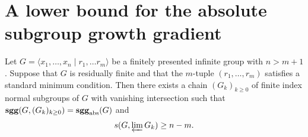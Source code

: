 \section{A lower bound for the absolute subgroup growth gradient}\label{section: lower bound subgroup growth gradient}

\begin{thm}\label{thm: subgroup growth gradient}
	Let $G=\langle x_1,\ldots, x_n\mid r_1,\ldots r_m\rangle$ be a finitely presented infinite group with $n>m+1$. Suppose that $G$ is residually finite and that the $m$-tuple $(r_1,\ldots,r_m)$ satisfies a standard minimum condition. Then there exists a chain $(G_k)_{k\ge 0}$ of finite index normal subgroups of $G$ with vanishing intersection such that $\mathbf{sgg}(G,(G_k)_{k\ge 0})=\mathbf{sgg}_{\mathrm{abs}}(G)$ and
	\[
	s(G,\varprojlim G_k)\ge n-m.
	\]
\end{thm}